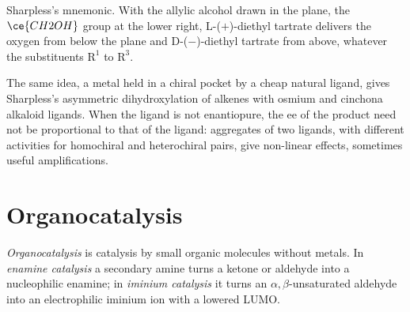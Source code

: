 \begin{omfigure}

{\small Sharpless's mnemonic. With the allylic alcohol drawn in the plane, the
$\ce{CH2OH}$ group at the lower right, L-($+$)-diethyl tartrate delivers the oxygen from
below the plane and D-($-$)-diethyl tartrate from above, whatever the
substituents $\mathrm R^1$ to $\mathrm R^3$.}
\end{omfigure}

The same idea, a metal held in a chiral pocket by a cheap natural ligand, gives
Sharpless's asymmetric dihydroxylation of alkenes with osmium and cinchona
alkaloid ligands. When the ligand is not enantiopure, the ee of the product
need not be proportional to that of the ligand: aggregates of two ligands, with
different activities for homochiral and heterochiral pairs, give non-linear
effects, sometimes useful amplifications.

\section{Organocatalysis}

\begin{definition}[Organocatalysis]\label{def:b3:asymmetric-synthesis:organocatalysis}
\emph{Organocatalysis} is catalysis by small organic
molecules without metals. In \emph{enamine catalysis} a
secondary amine turns a ketone or aldehyde into a nucleophilic enamine; in
\emph{iminium catalysis} it turns an $\alpha,\beta$-unsaturated
aldehyde into an electrophilic iminium ion with a lowered LUMO.
\end{definition}


